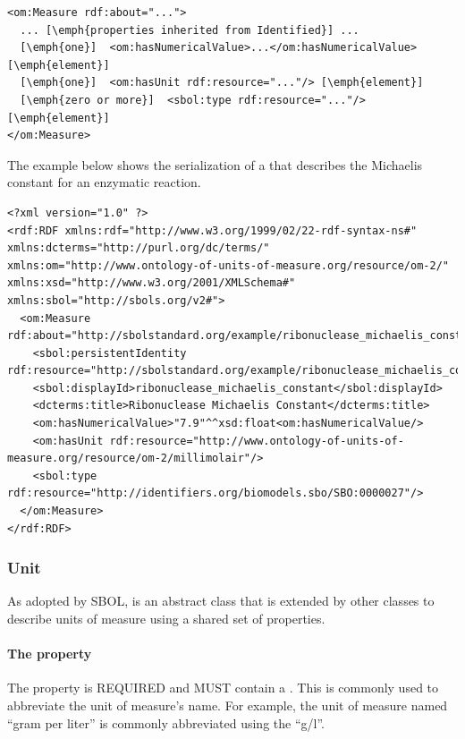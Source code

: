 \begin{lstlisting}
<om:Measure rdf:about="...">
  ... [\emph{properties inherited from Identified}] ...
  [\emph{one}]  <om:hasNumericalValue>...</om:hasNumericalValue> [\emph{element}]
  [\emph{one}]  <om:hasUnit rdf:resource="..."/> [\emph{element}]
  [\emph{zero or more}]  <sbol:type rdf:resource="..."/> [\emph{element}]
</om:Measure>
\end{lstlisting}


The example below shows the serialization of a  that describes the Michaelis constant for an enzymatic reaction.

\begin{lstlisting}
<?xml version="1.0" ?>
<rdf:RDF xmlns:rdf="http://www.w3.org/1999/02/22-rdf-syntax-ns#" xmlns:dcterms="http://purl.org/dc/terms/" xmlns:om="http://www.ontology-of-units-of-measure.org/resource/om-2/" xmlns:xsd="http://www.w3.org/2001/XMLSchema#" xmlns:sbol="http://sbols.org/v2#">
  <om:Measure rdf:about="http://sbolstandard.org/example/ribonuclease_michaelis_constant/1">
    <sbol:persistentIdentity rdf:resource="http://sbolstandard.org/example/ribonuclease_michaelis_constant"/>
    <sbol:displayId>ribonuclease_michaelis_constant</sbol:displayId>
    <dcterms:title>Ribonuclease Michaelis Constant</dcterms:title>
    <om:hasNumericalValue>"7.9"^^xsd:float<om:hasNumericalValue/>
    <om:hasUnit rdf:resource="http://www.ontology-of-units-of-measure.org/resource/om-2/millimolair"/>
    <sbol:type rdf:resource="http://identifiers.org/biomodels.sbo/SBO:0000027"/>
  </om:Measure>
</rdf:RDF>
\end{lstlisting}
\label{ser:Measure}


\subsubsection{Unit}
\label{sec:Unit}

As adopted by SBOL,  is an abstract class that is extended by other classes to describe units of measure using a shared set of properties. 

\paragraph{The  property}\label{sec:symbol:Unit}
The  property is REQUIRED and MUST contain a . This  is commonly used to abbreviate the unit of measure's name. For example, the unit of measure named ``gram per liter'' is commonly abbreviated using the  ``g/l''.

